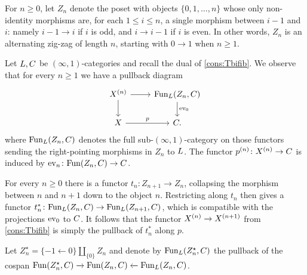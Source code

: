 \documentclass[a4paper,reqno,twoside]{amsart}
\begin{document}
\begin{definition}\label{def:zigzag}
	For $n \geq 0$, let $Z_{n}$ denote the poset with objects $\{0,1,\dots,n\}$ whose only non-identity morphisms are, for each $1 \leq i \leq n$, a single morphism between $i-1$ and $i$: namely $i-1 \to i$ if $i$ is odd, and $i \to i-1$ if $i$ is even. In other words, $Z_n$ is an alternating zig-zag of length $n$, starting with $0\to1$ when $n\geq1$.
\end{definition}

\begin{remark}\label{rem:zig1}
	Let $\relax{L}, \relax{C}$ be $(\infty,1)$-categories and recall the dual of \cref{cons:Tbifib}. We observe that for every $n\geq 1$ we have a pullback diagram
	\[
		\begin{tikzcd}
			\cX^{(n)} \arrow[d] \arrow[r] & \Fun_{\cL}(Z_n,\cC) \arrow[d,"\ev_0"] \\
			\cX \arrow[r,"p"] & \cC.
		\end{tikzcd}
	\]
	where $\mathrm{Fun}_{\relax{L}}(Z_n,\relax{C})$ denotes the full sub-$(\infty,1)$-category on those functors sending the right-pointing morphisms in $Z_n$ to $\relax{L}$. The functor $p^{(n)} \colon \relax{X}^{(n)} \to \relax{C}$ is induced by $\operatorname{ev}_n \colon \mathrm{Fun}(Z_n,\relax{C}) \to \relax{C}$.
\end{remark}

\begin{remark}\label{rem:zig2}
	For every $n \geq 0$ there is a functor $t_n \colon Z_{n+1} \to Z_n$, collapsing the morphism between $n$ and $n+1$ down to the object $n$. Restricting along $t_n$ then gives a functor $t_n^* \colon \mathrm{Fun}_{\relax{L}}(Z_n,\relax{C}) \to \mathrm{Fun}_{\relax{L}}(Z_{n+1},\relax{C})$, which is compatible with the projections $\operatorname{ev}_0$ to $\relax{C}$. It follows that the functor $\relax{X}^{(n)} \to \relax{X}^{(n+1)}$ from \cref{cons:Tbifib} is simply the pullback of $t_n^*$ along $p$.
\end{remark}

\begin{definition}
	Let $Z_{n}^{\star}=\{-1 \xleftarrow{}0\} \coprod_{\{0\}} Z_n$ and denote by $\mathrm{Fun}_{\relax{L}}(Z_n^{\star},\relax{C})$ the pullback of the cospan $\mathrm{Fun}(Z_n^{\star},\relax{C}) \xrightarrow{}{\mathrm{Fun}(Z_n,\relax{C})}\xleftarrow{} \mathrm{Fun}_{\relax{L}}(Z_n,\relax{C})$.
\end{definition}
\end{document}
